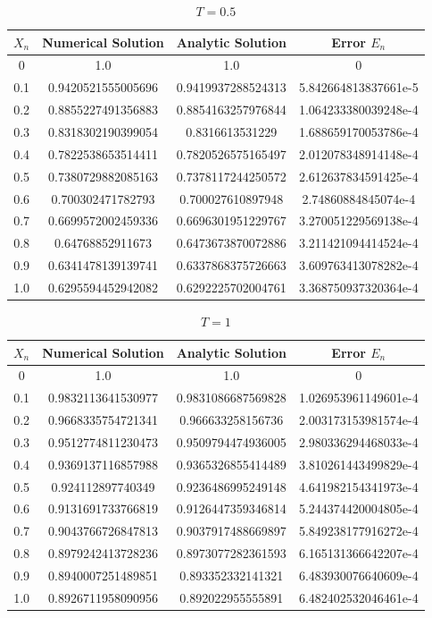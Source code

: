 \documentclass[10pt,a4paper,notitlepage]{article}
\begin{document}
\begin{table}[H]
\centering
\begin{tabular}{|c|c|c|c|}\hline $X_{n}$ & Numerical Solution & Analytic Solution & Error $E_{n}$ \\ \hline 0 & 1.0 & 1.0 & 0\\ 0.1 & 0.9420521555005696 & 0.9419937288524313 & 5.842664813837661e-5\\ 0.2 & 0.8855227491356883 & 0.8854163257976844 & 1.064233380039248e-4\\ 0.3 & 0.8318302190399054 & 0.8316613531229 & 1.688659170053786e-4\\ 0.4 & 0.7822538653514411 & 0.7820526575165497 & 2.012078348914148e-4\\ 0.5 & 0.7380729882085163 & 0.7378117244250572 & 2.612637834591425e-4\\ 0.6 & 0.700302471782793 & 0.700027610897948 & 2.74860884845074e-4\\ 0.7 & 0.6699572002459336 & 0.6696301951229767 & 3.270051229569138e-4\\ 0.8 & 0.64768852911673 & 0.6473673870072886 & 3.211421094414524e-4\\ 0.9 & 0.6341478139139741 & 0.6337868375726663 & 3.609763413078282e-4\\ 1.0 & 0.6295594452942082 & 0.6292225702004761 & 3.368750937320364e-4 \\ \hline \end{tabular}
\caption{$T=0.5$}
\end{table}
\begin{table}[H]
\centering
\begin{tabular}{|c|c|c|c|}\hline $X_{n}$ & Numerical Solution & Analytic Solution & Error $E_{n}$ \\ \hline 0 & 1.0 & 1.0 & 0\\ 0.1 & 0.9832113641530977 & 0.9831086687569828 & 1.026953961149601e-4\\ 0.2 & 0.9668335754721341 & 0.966633258156736 & 2.003173153981574e-4\\ 0.3 & 0.9512774811230473 & 0.9509794474936005 & 2.980336294468033e-4\\ 0.4 & 0.9369137116857988 & 0.9365326855414489 & 3.810261443499829e-4\\ 0.5 & 0.924112897740349 & 0.9236486995249148 & 4.641982154341973e-4\\ 0.6 & 0.9131691733766819 & 0.9126447359346814 & 5.244374420004805e-4\\ 0.7 & 0.9043766726847813 & 0.9037917488669897 & 5.849238177916272e-4\\ 0.8 & 0.8979242413728236 & 0.8973077282361593 & 6.165131366642207e-4\\ 0.9 & 0.8940007251489851 & 0.893352332141321 & 6.483930076640609e-4\\ 1.0 & 0.8926711958090956 & 0.892022955555891 & 6.482402532046461e-4 \\ \hline \end{tabular}
\caption{$T=1$}\label{tb:NumData2}
\end{table}
\end{document}
